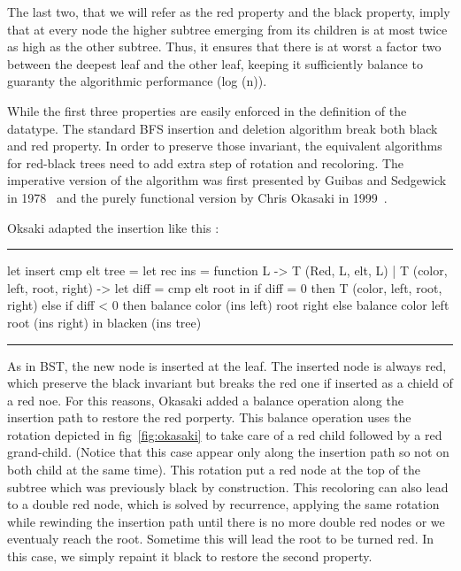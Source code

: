 \documentclass[10pt,a4paper]{article}
\newenvironment{codeblock}%
{\center \minipage{\textwidth} \vspace{6pt} \hrule \vspace{6pt} \minted{ocaml}}%
{\endminted \hrule \vspace{6pt} \endminipage \endcenter}
\begin{document}
The last two, that we will refer as the red property and the black property, imply that at every node the higher subtree emerging from its children is at most twice as high as the other subtree. Thus, it ensures that there is at worst a factor two between the deepest leaf and the other leaf, keeping it sufficiently balance to guaranty the algorithmic performance (log (n)).


While the first three properties are easily enforced in the definition of the datatype. The standard BFS insertion and deletion algorithm break both black and red property.
In order to preserve those invariant, the equivalent algorithms for red-black trees need to add extra step of rotation and recoloring.
The imperative version of the algorithm was first presented by Guibas and Sedgewick in 1978~\cite{guibas_1978} and the purely functional version by Chris Okasaki in 1999~\cite{okasaki_1999}.

Oksaki adapted the insertion like this :
\begin{codeblock}
let insert cmp elt tree =
    let rec ins = function
        L -> T (Red, L, elt, L)
      | T (color, left, root, right) ->
         let diff = cmp elt root in
         if diff = 0 then T (color, left, root, right)
         else if diff < 0 then
            balance color (ins left) root right
         else
            balance color left root (ins right)
    in blacken (ins tree)
\end{codeblock}

As in BST, the new node is inserted at the leaf.
The inserted node is always red, which preserve the black invariant but breaks the red one if inserted as a chield of a red noe.
For this reasons, Okasaki added a balance operation along the insertion path to restore the red porperty. This balance operation uses the rotation depicted in fig~\ref{fig:okasaki} to take care of a red child followed by a red grand-child. (Notice that this case appear only along the insertion path so not on both child at the same time).
This rotation put a red node at the top of the subtree which was previously black by construction.
This recoloring can also lead to a double red node, which is solved by recurrence, applying the same rotation while rewinding the insertion path until there is no more double red nodes or we eventualy reach the root.
Sometime this will lead the root to be turned red. In this case, we simply repaint it black to restore the second property.
\end{document}
